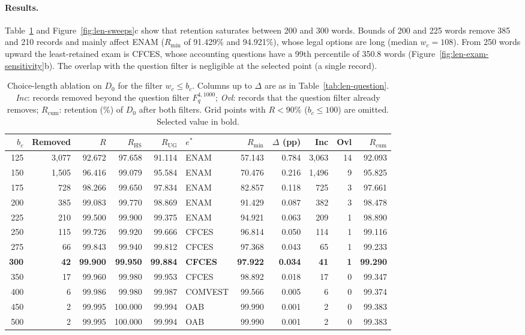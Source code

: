 \paragraph{Results.} Table~\ref{tab:len-choices} and
Figure~\ref{fig:len-sweeps}c show that retention saturates between 200 and
300 words. Bounds of 200 and 225 words remove 385 and 210 records and mainly
affect ENAM ($R_{\min}$ of 91.429\% and 94.921\%), whose legal options are
long (median $w_c = 108$). From 250 words upward the least-retained exam is
CFCES, whose accounting questions have a 99th percentile of 350.8 words
(Figure~\ref{fig:len-exam-sensitivity}b). The overlap with the question filter
is negligible at the selected point (a single record).

\begin{table}[t]
\centering
\small
\setlength{\tabcolsep}{4.5pt}
\begin{tabular}{@{}rrrrrlrrrrr@{}}
\toprule
$b_c$ & Removed & $R$ & $R_{\mathrm{HS}}$ & $R_{\mathrm{UG}}$ & $e^{*}$ & $R_{\min}$ & $\Delta$ (pp) & Inc & Ovl & $R_{\mathrm{cum}}$ \\
\midrule
125 & 3,077 & 92.672 & 97.658 & 91.114 & ENAM & 57.143 & 0.784 & 3,063 & 14 & 92.093 \\
150 & 1,505 & 96.416 & 99.079 & 95.584 & ENAM & 70.476 & 0.216 & 1,496 & 9 & 95.825 \\
175 & 728 & 98.266 & 99.650 & 97.834 & ENAM & 82.857 & 0.118 & 725 & 3 & 97.661 \\
200 & 385 & 99.083 & 99.770 & 98.869 & ENAM & 91.429 & 0.087 & 382 & 3 & 98.478 \\
225 & 210 & 99.500 & 99.900 & 99.375 & ENAM & 94.921 & 0.063 & 209 & 1 & 98.890 \\
250 & 115 & 99.726 & 99.920 & 99.666 & CFCES & 96.814 & 0.050 & 114 & 1 & 99.116 \\
275 & 66 & 99.843 & 99.940 & 99.812 & CFCES & 97.368 & 0.043 & 65 & 1 & 99.233 \\
\textbf{300} & \textbf{42} & \textbf{99.900} & \textbf{99.950} & \textbf{99.884} & \textbf{CFCES} & \textbf{97.922} & \textbf{0.034} & \textbf{41} & \textbf{1} & \textbf{99.290} \\
350 & 17 & 99.960 & 99.980 & 99.953 & CFCES & 98.892 & 0.018 & 17 & 0 & 99.347 \\
400 & 6 & 99.986 & 99.980 & 99.987 & COMVEST & 99.566 & 0.005 & 6 & 0 & 99.374 \\
450 & 2 & 99.995 & 100.000 & 99.994 & OAB & 99.990 & 0.001 & 2 & 0 & 99.383 \\
500 & 2 & 99.995 & 100.000 & 99.994 & OAB & 99.990 & 0.001 & 2 & 0 & 99.383 \\
\bottomrule
\end{tabular}
\caption{Choice-length ablation on $D_0$ for the filter $w_c \le b_c$.
Columns up to $\Delta$ are as in Table~\ref{tab:len-question}.
\emph{Inc}: records removed beyond the question filter $F_q^{4,1000}$;
\emph{Ovl}: records that the question filter already removes;
$R_{\mathrm{cum}}$: retention (\%) of $D_0$ after both filters. Grid points
with $R < 90\%$ ($b_c \le 100$) are omitted. Selected value in bold.}
\label{tab:len-choices}
\end{table}

